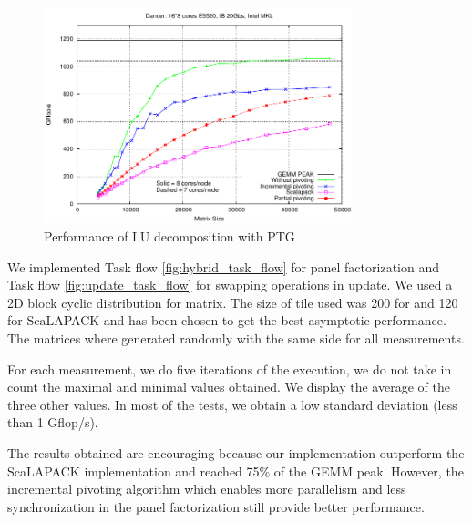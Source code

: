 


\begin{figure}
\centering
\includegraphics[width=0.8\textwidth]{figures/gepp.pdf}
\caption{Performance of LU decomposition with PTG\label{fig:pp}} 
\end{figure}

 
We implemented Task flow \ref{fig:hybrid_task_flow} for panel factorization and Task flow \ref{fig:update_task_flow} for swapping operations in update. 
We used a 2D block cyclic distribution for matrix. The size of tile used was 200 for \dague and 120 for ScaLAPACK and has been chosen to get the best asymptotic performance. The matrices where generated randomly with the same side for all measurements.

For each measurement, we do five iterations of the execution, we do not take in count the maximal and minimal values obtained. We display the average of the three other values. In most of the tests, we obtain a low standard deviation (less than 1 Gflop/s).

The results obtained are encouraging  because our implementation outperform the ScaLAPACK implementation and reached 75\% of the GEMM peak.
However, the incremental pivoting algorithm which enables more parallelism and less synchronization in the panel factorization still provide better performance.



